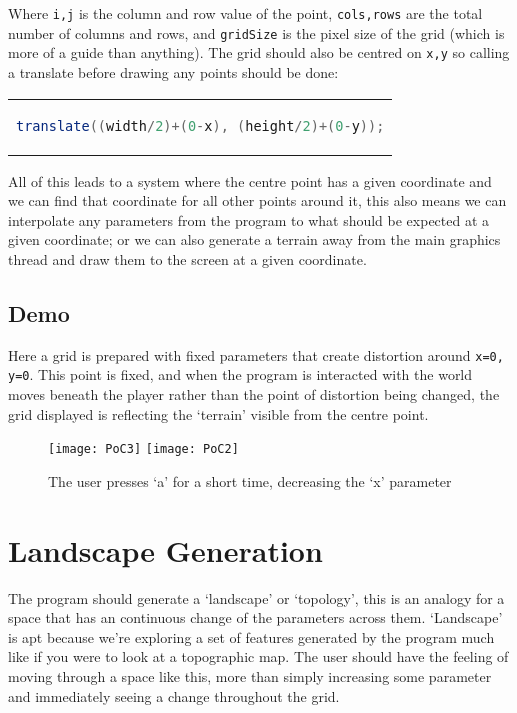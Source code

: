 Where \verb|i,j| is the column and row value of the point, \verb|cols,rows|
are the total number of columns and rows, and \verb|gridSize| is the pixel size
of the grid (which is more of a guide than anything). The grid should also
be centred on \verb|x,y| so calling a translate before drawing any points should
be done:

\begin{center}
\begin{tabular}{c}
\begin{lstlisting}[language=java]
translate((width/2)+(0-x), (height/2)+(0-y));
\end{lstlisting}
\end{tabular}
\end{center}

All of this leads to a system where the centre point has a given coordinate and
we can find that coordinate for all other points around it, this also means we
can interpolate any parameters from the program to what should be expected at a
given coordinate; or we can also generate a terrain away from the main graphics
thread and draw them to the screen at a given coordinate.

\subsection{Demo}
Here a grid is prepared with fixed parameters that create distortion around
\verb|x=0, y=0|. This point is fixed, and when the program is interacted with
the world moves beneath the player rather than the point of distortion being
changed, the grid displayed is reflecting the `terrain' visible from the centre
point.

\begin{figure}[H]
\centering
\texttt{[image: PoC3]}
\hspace*{0.5cm}
\texttt{[image: PoC2]}
\caption{The user presses `a' for a short time, decreasing the `x' parameter}
\label{demomovement}
\end{figure}

\section{Landscape Generation}
The program should generate a `landscape' or `topology', this is an analogy for
a space that has an continuous change of the parameters across them. `Landscape'
is apt because we're exploring a set of features generated by the program much
like if you were to look at a topographic map. The user should have the feeling
of moving through a space like this, more than simply increasing some parameter
and immediately seeing a change throughout the grid.

